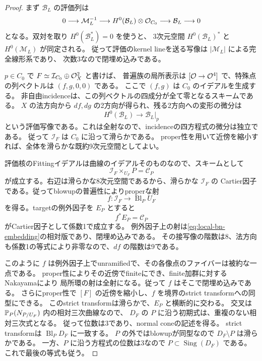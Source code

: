 \begin{proof}
まず $\mathcal B_L$ の評価列は
\begin{equation}\label{eq:local-bn-embedding}
 0\longrightarrow\mathcal M_L^{-1}
 \longrightarrow H^0(\mathcal B_L)\otimes\mathcal O_{C_0}
 \longrightarrow\mathcal B_L\longrightarrow0
\end{equation}
となる。双対を取り $H^0(\mathcal B_L^*)=0$ を使うと、
3次元空間 $H^0(\mathcal B_L)^*$ と $H^0(\mathcal M_L)$ が同定される。
従って評価のkernel lineを送る写像は $|\mathcal M_L|$ による完全線形系であり、
次数3なので閉埋め込みである。

$p\in C_0$ で $F\simeq\mathcal I_{C_0}\oplus\mathcal O_X^2$ と書けば、
普遍族の局所表示は $[\mathcal O\to\mathcal O^4]$ で、特殊点の列ベクトルは $(f,g,0,0)$ である。
ここで $(f,g)$ は $C_0$ のイデアルを生成する。
非自由incidenceは、この列ベクトルの四成分が全て零となるスキームである。
$X$ の法方向から $df,dg$ の2方向が得られ、残る2方向への変形の微分は
\[
 H^0(\mathcal B_L)\longrightarrow\mathcal B_L|_p
\]
という評価写像である。これは全射なので、incidenceの四方程式の微分は独立である。
従って $\mathcal I_F$ は $C_0$ に沿って滑らかである。
proper性を用いて近傍を縮小すれば、全体を滑らかな既約9次元空間としてよい。

評価核のFittingイデアルは曲線のイデアルそのものなので、スキームとして
\[
 \mathcal I_F\times_{U_F}P=\mathscr C_P
\]
が成立する。右辺は滑らかな8次元空間であるから、滑らかな $\mathcal I_F$ の
Cartier因子である。従ってblowupの普遍性によりproperな射
\[
 f:\mathcal I_F\longrightarrow\operatorname{Bl}_P U_F
\]
を得る。targetの例外因子を $E_P$ とすると
\[
 f^*E_P=\mathscr C_P
\]
がCartier因子として係数1で成立する。
例外因子上の射は\eqref{eq:local-bn-embedding}の相対版であり、閉埋め込みである。
その接写像の階数は8、法方向も係数1の等式により非零なので、$df$ の階数は9である。

このように $f$ は例外因子上でunramifiedで、その各像点のファイバーは被約な一点である。
proper性によりその近傍でfiniteにでき、finite加群に対するNakayamaにより
局所環の射は全射になる。従って $f$ はそこで閉埋め込みである。
さらにproper性で $[F]$ の近傍を縮小し、$f$ を境界のstrict transformへの同型にできる。
このstrict transformは滑らかで、$E_P$ と横断的に交わる。
交叉は $\mathbb P_P(N_{P/U_F})$ 内の相対三次曲線なので、
$D_F$ の $P$ に沿う初期式は、重複のない相対三次式となる。
従って位数は3であり、normal coneの記述を得る。
strict transformは $\operatorname{Bl}_P D_F$ に一致する。
$P$ の外ではblowupが同型なので $D_F\setminus P$ は滑らかである。
一方、$P$ に沿う方程式の位数は3なので $P\subset\operatorname{Sing}(D_F)$ である。
これで最後の等式も従う。
\end{proof}


